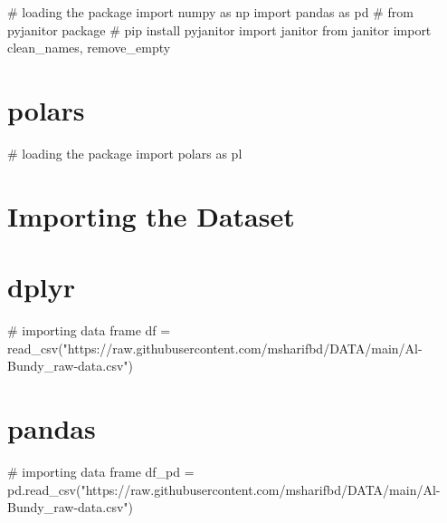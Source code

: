 \documentclass[
  letterpaper,
  DIV=11,
  numbers=noendperiod]{scrreprt}
\newenvironment{Shaded}{\begin{snugshade}}{\end{snugshade}}
\newcommand{\CommentTok}[1]{\textcolor[rgb]{0.37,0.37,0.37}{#1}}
\newcommand{\FunctionTok}[1]{\textcolor[rgb]{0.28,0.35,0.67}{#1}}
\newcommand{\ImportTok}[1]{\textcolor[rgb]{0.00,0.46,0.62}{#1}}
\newcommand{\NormalTok}[1]{\textcolor[rgb]{0.00,0.23,0.31}{#1}}
\newcommand{\OperatorTok}[1]{\textcolor[rgb]{0.37,0.37,0.37}{#1}}
\newcommand{\OtherTok}[1]{\textcolor[rgb]{0.00,0.23,0.31}{#1}}
\newcommand{\StringTok}[1]{\textcolor[rgb]{0.13,0.47,0.30}{#1}}
\begin{document}
\begin{Shaded}
\begin{Highlighting}[]
\CommentTok{\# loading the package}
\ImportTok{import}\NormalTok{ numpy }\ImportTok{as}\NormalTok{ np}
\ImportTok{import}\NormalTok{ pandas }\ImportTok{as}\NormalTok{ pd}
\CommentTok{\# from pyjanitor package }
\CommentTok{\# pip install pyjanitor}
\ImportTok{import}\NormalTok{ janitor }
\ImportTok{from}\NormalTok{ janitor }\ImportTok{import}\NormalTok{ clean\_names, remove\_empty}
\end{Highlighting}
\end{Shaded}

\section{polars}

\begin{Shaded}
\begin{Highlighting}[]
\CommentTok{\# loading the package }
\ImportTok{import}\NormalTok{ polars }\ImportTok{as}\NormalTok{ pl}
\end{Highlighting}
\end{Shaded}

\section{Importing the Dataset}\label{importing-the-dataset}

\section{dplyr}

\begin{Shaded}
\begin{Highlighting}[]
\CommentTok{\# importing data frame }
\NormalTok{df }\OtherTok{=} \FunctionTok{read\_csv}\NormalTok{(}\StringTok{"https://raw.githubusercontent.com/msharifbd/DATA/main/Al{-}Bundy\_raw{-}data.csv"}\NormalTok{)}
\end{Highlighting}
\end{Shaded}

\section{pandas}

\begin{Shaded}
\begin{Highlighting}[]
\CommentTok{\# importing data frame }
\NormalTok{df\_pd }\OperatorTok{=}\NormalTok{ pd.read\_csv(}\StringTok{"https://raw.githubusercontent.com/msharifbd/DATA/main/Al{-}Bundy\_raw{-}data.csv"}\NormalTok{)}
\end{Highlighting}
\end{Shaded}
\end{document}
